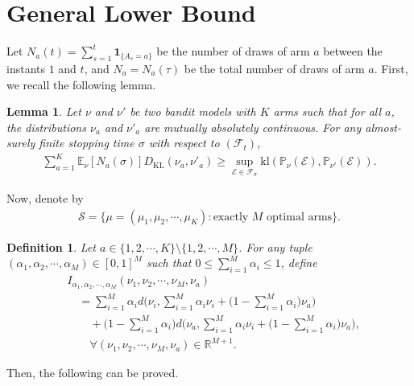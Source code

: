 \documentclass[final]{IEEEtran}
\newcommand{\nn}{\nonumber}
\newcommand{\calE}{\mathcal{E}}
\newcommand{\calF}{\mathcal{F}}
\newcommand{\calS}{\mathcal{S}}
\newcommand{\bbE}{\mathbb{E}}
\newcommand{\bbP}{\mathbb{P}}
\newcommand{\bbR}{\mathbb{R}}
\newcommand{\bone}{\mathbf{1}}
\newtheorem{lemma}[theorem]{Lemma}
\newtheorem{definition}[theorem]{Definition}
\begin{document}
\section{General Lower Bound}
Let $N_a(t)=\sum_{s=1}^t \bone_{\{A_s=a\}}$ be the number of draws of arm $a$ between the instants $1$ and $t$, and $N_a=N_a(\tau)$ be the total number of draws of arm $a$.  
First, we recall the following lemma. 
\begin{lemma}\cite[Lemma 1]{Kaufmann2014OnTC}  \label{trans:lem} 
Let $\nu$ and $\nu'$ be two bandit models with $K$ arms such that for all $a$, the distributions $\nu_a$ and $\nu'_a$ are mutually absolutely continuous.  For any almost-surely finite stopping time $\sigma$ with respect to $(\calF_t)$,
\begin{align}
\sum_{a=1}^K \bbE_{\nu}[N_a(\sigma)] D_{\text{KL}}(\nu_a,\nu'_a) \geq \sup_{\calE \in \calF_{\sigma}} \text{kl}(\bbP_{\nu}(\calE), \bbP_{\nu'}(\calE)).
\end{align}
\end{lemma}
Now, denote by
\begin{align}
\calS=\big\{\mu=(\mu_1,\mu_2,\cdots,\mu_K): \mbox{exactly $M$ optimal arms}\big\}. 
\end{align}
\begin{definition} \label{defI}
Let $a \in \{1,2,\cdots,K\}\setminus \{1,2,\cdots,M\}$. For any tuple $(\alpha_1, \alpha_2, \cdots, \alpha_M) \in [0,1]^M$ such that $0\leq \sum_{i=1}^M \alpha_i\leq 1$, define
\begin{align}
&I_{\alpha_1,\alpha_2,\cdots,\alpha_M}(\nu_1,\nu_2,\cdots, \nu_M,\nu_a)\nn\\
&\quad =\sum_{i=1}^M \alpha_i d\bigg(
\nu_i, \sum_{i=1}^M \alpha_i \nu_i+\bigg(1-\sum_{i=1}^M \alpha_i\bigg)\nu_a\bigg)\nn\\
&\qquad +\bigg(1-\sum_{i=1}^M \alpha_i\bigg) d\bigg(\nu_a, \sum_{i=1}^M \alpha_i \nu_i+\bigg(1-\sum_{i=1}^M \alpha_i\bigg)\nu_a\bigg), \nn\\
&\qquad \forall (\nu_1,\nu_2,\cdots,\nu_M,\nu_a) \in \bbR^{M+1}. 
\end{align} 
\end{definition}
Then, the following can be proved. 
\end{document}
